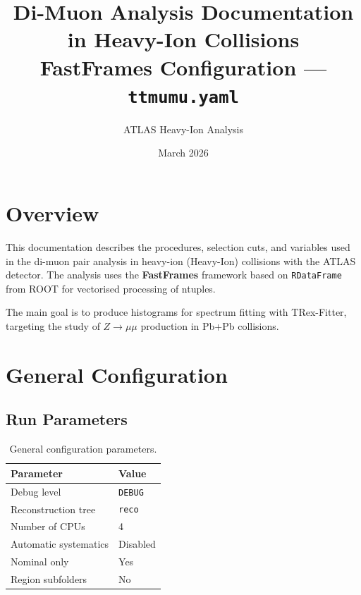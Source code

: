 \documentclass[12pt,a4paper]{article}
\title{\textbf{Di-Muon Analysis Documentation in Heavy-Ion Collisions}\\
\large FastFrames Configuration --- \texttt{ttmumu.yaml}}
\author{ATLAS Heavy-Ion Analysis}
\date{March 2026}
\begin{document}
\maketitle
\tableofcontents
\newpage

\section{Overview}

This documentation describes the procedures, selection cuts, and variables
used in the di-muon pair analysis in heavy-ion (Heavy-Ion) collisions
with the ATLAS detector. The analysis uses the \textbf{FastFrames} framework based on
\texttt{RDataFrame} from ROOT for vectorised processing of ntuples.

The main goal is to produce histograms for spectrum fitting with
TRex-Fitter, targeting the study of $Z \to \mu\mu$ production in Pb+Pb collisions.

\section{General Configuration}

\subsection{Run Parameters}

\begin{table}[h!]
\centering
\caption{General configuration parameters.}
\begin{tabular}{ll}
\toprule
\textbf{Parameter} & \textbf{Value} \\
\midrule
Debug level                    & \texttt{DEBUG} \\
Reconstruction tree            & \texttt{reco} \\
Number of CPUs                 & 4 \\
Automatic systematics          & Disabled \\
Nominal only                   & Yes \\
Region subfolders              & No \\
\bottomrule
\end{tabular}
\end{table}
\end{document}
